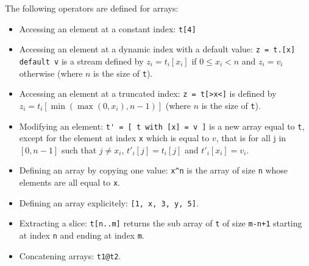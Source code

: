 \documentclass[a4paper]{article}
\begin{document}
The following operators are defined for arrays:
\begin{itemize}
\item Accessing an element at a constant index: \lstinline{t[4]}
\item Accessing an element at a dynamic index with a default value: \lstinline{z = t.[x] default v} is a stream defined by $z_i = t_i[x_i]$ if $0 \leq x_i < n$ and $z_i = v_i$ otherwise (where $n$ is the size of \lstinline+t+).
\item Accessing an element at a truncated index: \lstinline+z = t[>x<]+ is defined by $z_i = t_i[\min(\max(0, x_i), n-1)]$ (where $n$ is the size of \lstinline+t+).
\item Modifying an element: \lstinline{t' = [ t with [x] = v ]} is a new array equal to \lstinline+t+, except for the element at index \lstinline+x+ which is equal to $v$, that is for all j in $[0, n-1]$ such that $j \neq x_i$, $t'_i[j] = t_i[j]$ and $t'_i[x_i] = v_i$.
\item Defining an array by copying one value: \lstinline+x^n+ is the array of size \lstinline+n+ whose elements are all equal to \lstinline+x+.
\item Defining an array explicitely:  \lstinline+[1, x, 3, y, 5]+.
\item Extracting a slice: \lstinline+t[n..m]+ returns the sub array of \lstinline+t+ of size \lstinline{m-n+1} starting at index \lstinline+n+ and ending at index \lstinline+m+.
\item Concatening arrays: \lstinline+t1@t2+.
\end{itemize}
\end{document}
